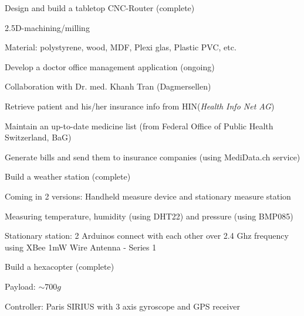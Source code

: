 \begin{cventries}
  \cventry
    {} %
    {Design and build a tabletop CNC-Router (complete)} %
    {} %
    {} %
    {\vspace{-12pt}
      \begin{cvitems} %
        \item {2.5D-machining/milling}
        \item {Material: polystyrene, wood, MDF, Plexi glas, Plastic PVC, etc.}
      \end{cvitems}
    }

\end{cventries}
	
	\cventry
	{} %
	{Develop a doctor office management application (ongoing)} %
	{} %
	{} %
	{\vspace{-12pt}
		\begin{cvitems} %
			\item {Collaboration with Dr. med. Khanh Tran (Dagmersellen)}
			\item {Retrieve patient and his/her insurance info from HIN(\textit{Health Info Net AG})}
			\item {Maintain an up-to-date medicine list (from Federal Office of Public Health Switzerland, BaG)}
			\item {Generate bills and send them to insurance companies (using MediData.ch service)}
		\end{cvitems}
	}
	
	\cventry
	{} %
	{Build a weather station (complete)} %
	{} %
	{} %
	{\vspace{-12pt}
		\begin{cvitems} %
			\item {Coming in 2 versions: Handheld measure device and stationary measure station}
			\item {Measuring temperature, humidity (using DHT22) and pressure (using BMP085)}
			\item {Stationary station: 2 Arduinos connect with each other over 2.4 Ghz frequency using XBee 1mW Wire Antenna - Series 1}
		\end{cvitems}
	}
	
	\cventry
	{} %
	{Build a hexacopter (complete)} %
	{} %
	{} %
	{\vspace{-12pt}
		\begin{cvitems} %
			\item {Payload: $ \sim 700g$}
			\item {Controller: Paris SIRIUS with 3 axis gyroscope and GPS receiver}
		\end{cvitems}
	}
	

